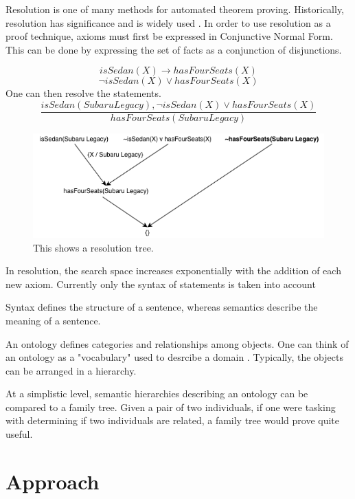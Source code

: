 \documentclass{article}
\begin{document}
Resolution is one of many methods for automated theorem proving. Historically, resolution has significance and is widely used \cite[51]{ertel2018introduction}.
In order to use resolution as a proof technique, axioms must first be expressed in Conjunctive Normal Form. This can be done by expressing the set of facts as a conjunction of disjunctions. 
\begin{singlespace}
		 \[isSedan(X) \rightarrow hasFourSeats(X)\]
		\[\lnot isSedan(X) \lor hasFourSeats(X)\]
		One can then resolve the statements. 
		\[\frac{isSedan(Subaru Legacy), \lnot isSedan(X) \lor hasFourSeats(X)}{hasFourSeats(Subaru Legacy)}\]
\end{singlespace} 

\begin{figure}[h]
\centering
\includegraphics[width=6in]{resolution_tree}
\caption{This shows a resolution tree.}
\label{fig:resolution_tree}
\end{figure}

In resolution, the search space increases exponentially with the addition of each new axiom. 
Currently only the syntax of statements is taken into account

	

        Syntax defines the structure of a sentence, whereas semantics describe the meaning of a sentence. 
	

		An ontology defines categories and relationships among objects.
		One can think of an ontology as a "vocabulary" used to desrcibe a domain \cite[308]{russell2016artificial}. Typically, the objects can be arranged in a hierarchy. 
		
	At a simplistic level, semantic hierarchies describing an ontology can be compared to a family tree. Given a pair of two individuals, if one were tasking with determining if two individuals are related, a family tree would prove quite useful. 


	\newpage	
	\section{Approach}
\end{document}
